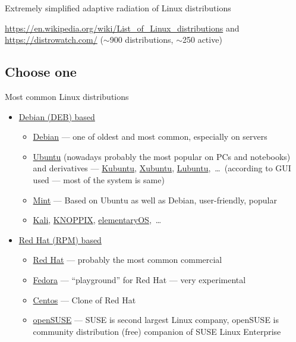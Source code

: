 \documentclass[compress, ucs, xelatex, 11pt, xcolor=svgnames, aspectratio=169,
	hyperref={
		bookmarks=true,
		unicode=true,
		colorlinks=true,
		pdftitle={Linux, command line and MetaCentrum},
		plainpages=false,
		pdfauthor={Vojtech Zeisek},
		pdfsubject={Course about use of Linux command line, writing shell scripts and using MetaCentrum of CESNET},
		pdfcreator={XeLaTeX},
		pdfkeywords={Linux, GNU, BASH, shell, command line, MetaCentrum},
		linkcolor=DarkRed, %
		anchorcolor=DarkBlue, %
		citecolor=Indigo, %
		filecolor=NavyBlue, %
		menucolor=DarkMagenta, %
		urlcolor=DarkBlue, %
		pdftex},
	url={hyphens, lowtilde} %
	]{beamer}
\renewcommand{\texttt}[1]{\colorbox{Beige}{{\ttfamily #1}}}
\begin{document}
\begin{frame}{Extremely simplified adaptive radiation of Linux distributions}
	\begin{center}
		\texttt{[image: linux\_fylogen\_2.png]}
	\end{center}
	\vfil
	\url{https://en.wikipedia.org/wiki/List_of_Linux_distributions} and \url{https://distrowatch.com/} ($\sim$900 distributions, $\sim$250 active)
	\vfill
\end{frame}

\subsection{Choose one}

\begin{frame}{Most common Linux distributions}
	\begin{itemize}
		\item \href{https://distrowatch.com/search.php?package=DEB}{Debian (DEB) based}
		\begin{itemize}
			\item \href{https://www.debian.org/}{Debian} --- one of oldest and most common, especially on servers
			\item \href{https://ubuntu.com/}{Ubuntu} (nowadays probably the most popular on PCs and notebooks) and derivatives --- \href{https://kubuntu.org/}{Kubuntu}, \href{https://xubuntu.org/}{Xubuntu}, \href{https://lubuntu.me/}{Lubuntu},~\ldots~(according to GUI used --- most of the system is same)
			\item \href{https://linuxmint.com/}{Mint} --- Based on Ubuntu as well as Debian, user-friendly, popular
			\item \href{https://www.kali.org/}{Kali}, \href{https://knopper.net/knoppix/index-en.html}{KNOPPIX}, \href{https://elementary.io/}{elementaryOS},~\ldots
		\end{itemize}
		\item \href{https://distrowatch.com/search.php?package=RPM}{Red Hat (RPM) based}
		\begin{itemize}
			\item \href{https://www.redhat.com/}{Red Hat} --- probably the most common commercial
			\item \href{https://getfedora.org/}{Fedora} --- \enquote{playground} for Red Hat --- very experimental
			\item \href{https://www.centos.org/}{Centos} --- Clone of Red Hat
			\item \href{https://www.opensuse.org/}{openSUSE} --- SUSE is second largest Linux company, openSUSE is community distribution (free) companion of SUSE Linux Enterprise

\end{itemize}
\end{itemize}
\end{frame}
\end{document}
